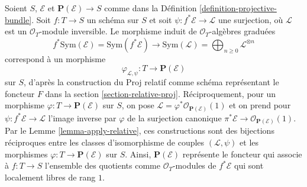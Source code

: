 \medskip\noindent
Soient $S$, $\mathcal{E}$ et $\mathbf{P}(\mathcal{E}) \to S$ comme dans la
Définition \ref{definition-projective-bundle}. Soit $f : T \to S$ un
schéma sur $S$ et soit $\psi : f^*\mathcal{E} \to \mathcal{L}$ une
surjection, où $\mathcal{L}$ est un $\mathcal{O}_T$-module inversible.
Le morphisme induit de $\mathcal{O}_T$-algèbres graduées
$$
f^*\text{Sym}(\mathcal{E}) = \text{Sym}(f^*\mathcal{E}) \to
\text{Sym}(\mathcal{L}) = \bigoplus\nolimits_{n \geq 0} \mathcal{L}^{\otimes n}
$$ correspond à un morphisme
$$
\varphi_{\mathcal{L}, \psi} : T \longrightarrow \mathbf{P}(\mathcal{E})
$$
sur $S$, d'après la construction du Proj relatif comme schéma représentant
le foncteur $F$ dans la section \ref{section-relative-proj}.
Réciproquement, pour un morphisme $\varphi : T \to \mathbf{P}(\mathcal{E})$
sur $S$, on pose
$\mathcal{L} = \varphi^*\mathcal{O}_{\mathbf{P}(\mathcal{E})}(1)$ et on
prend pour $\psi : f^*\mathcal{E} \to \mathcal{L}$ l'image inverse par
$\varphi$ de la surjection canonique
$\pi^*\mathcal{E} \to \mathcal{O}_{\mathbf{P}(\mathcal{E})}(1)$.
Par le Lemme \ref{lemma-apply-relative}, ces constructions sont des
bijections réciproques entre les classes d'isomorphisme de couples
$(\mathcal{L}, \psi)$ et les morphismes
$\varphi : T \to \mathbf{P}(\mathcal{E})$ sur $S$.
Ainsi, $\mathbf{P}(\mathcal{E})$ représente le foncteur qui associe à
$f : T \to S$ l'ensemble des quotients comme $\mathcal{O}_T$-modules de
$f^*\mathcal{E}$ qui sont localement libres de rang $1$.

